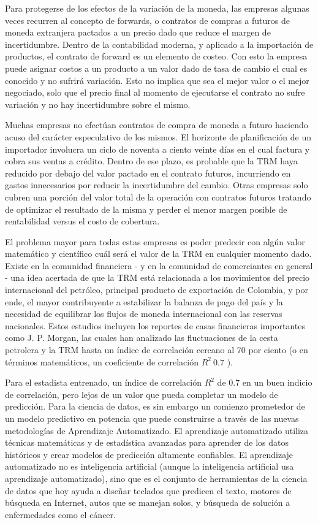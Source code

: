 Para protegerse de los efectos de la variación de la moneda, las empresas algunas veces recurren al concepto de forwards, o contratos de compras a futuros de moneda extranjera pactados a un precio dado que reduce el margen de incertidumbre. Dentro de la contabilidad moderna, y aplicado a la importación de productos, el contrato de forward es un elemento de costeo. Con esto la empresa puede asignar costos a un producto a un valor dado de tasa de cambio el cual es conocido y no sufrirá variación. Esto no implica que sea el mejor valor o el mejor negociado, solo que el precio final al momento de ejecutarse el contrato no sufre variación y no hay incertidumbre sobre el mismo. 

Muchas empresas no efectúan contratos de compra de moneda a futuro haciendo acuso del carácter especulativo de los mismos. El horizonte de planificación de un importador involucra un ciclo de noventa a ciento veinte días en el cual factura y cobra sus ventas a crédito. Dentro de ese plazo, es probable que la TRM haya reducido por debajo del valor pactado en el contrato futuros, incurriendo en gastos innecesarios por reducir la incertidumbre del cambio. Otras empresas solo cubren una porción del valor total de la operación con contratos futuros tratando de optimizar el resultado de la misma y perder el menor margen posible de rentabilidad versus el costo de cobertura. 

El problema mayor para todas estas empresas es poder predecir con algún valor matemático y científico cuál será el valor de la TRM en cualquier momento dado. Existe en la comunidad financiera - y en la comunidad de comerciantes en general - una idea acertada de que la TRM está relacionada a los movimientos del precio internacional del petróleo, principal producto de exportación de Colombia, y por ende, el mayor contribuyente a estabilizar la balanza de pago del país y la necesidad de equilibrar los flujos de moneda internacional con las reservas nacionales. Estos estudios incluyen los reportes de casas financieras importantes como J. P. Morgan, las cuales han analizado las fluctuaciones de la cesta petrolera y la TRM hasta un índice de correlación cercano al 70 por ciento (o en términos matemáticos, un coeficiente de correlación \(R^{2} ~ 0.7\) ). 

Para el estadista entrenado, un índice de correlación \(R^{2}\) de 0.7 en un buen indicio de correlación, pero lejos de un valor que pueda completar un modelo de predicción. Para la ciencia de datos, es sin embargo un comienzo prometedor de un modelo predictivo en potencia que puede construirse a través de las nuevas metodologías de Aprendizaje Automatizado. El aprendizaje automatizado utiliza técnicas matemáticas y de estadística avanzadas para aprender de los datos históricos y crear modelos de predicción altamente confiables. El aprendizaje automatizado no es inteligencia artificial (aunque la inteligencia artificial usa aprendizaje automatizado), sino que es el conjunto de herramientas de la ciencia de datos que hoy ayuda a diseñar teclados que predicen el texto, motores de búsqueda en Internet, autos que se manejan solos, y búsqueda de solución a enfermedades como el cáncer. 

